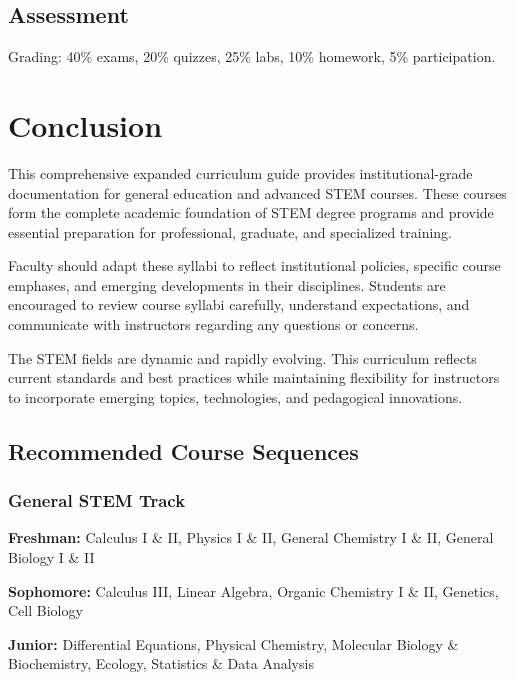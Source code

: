\documentclass[12pt,oneside]{book}
\begin{document}
\section{Assessment}

Grading: 40\% exams, 20\% quizzes, 25\% labs, 10\% homework, 5\% participation.


\chapter*{Conclusion}

This comprehensive expanded curriculum guide provides institutional-grade documentation for general education and advanced STEM courses. These courses form the complete academic foundation of STEM degree programs and provide essential preparation for professional, graduate, and specialized training.

Faculty should adapt these syllabi to reflect institutional policies, specific course emphases, and emerging developments in their disciplines. Students are encouraged to review course syllabi carefully, understand expectations, and communicate with instructors regarding any questions or concerns.

The STEM fields are dynamic and rapidly evolving. This curriculum reflects current standards and best practices while maintaining flexibility for instructors to incorporate emerging topics, technologies, and pedagogical innovations.

\section*{Recommended Course Sequences}

\subsection*{General STEM Track}

\textbf{Freshman:} Calculus I \& II, Physics I \& II, General Chemistry I \& II, General Biology I \& II

\textbf{Sophomore:} Calculus III, Linear Algebra, Organic Chemistry I \& II, Genetics, Cell Biology

\textbf{Junior:} Differential Equations, Physical Chemistry, Molecular Biology \& Biochemistry, Ecology, Statistics \& Data Analysis
\end{document}

